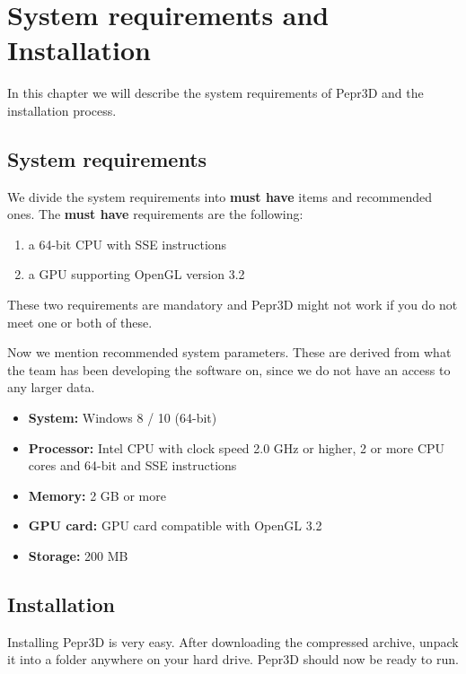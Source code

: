 \chapter{System requirements and Installation}

In this chapter we will describe the system requirements of Pepr3D and the installation process.

\section{System requirements}

We divide the system requirements into \textbf{must have} items and recommended ones. The \textbf{must have} requirements are the following:

\begin{enumerate}
\item a 64-bit CPU with SSE instructions
\item a GPU supporting OpenGL version 3.2
\end{enumerate}

These two requirements are mandatory and Pepr3D might not work if you do not meet one or both of these.

Now we mention recommended system parameters. These are derived from what the team has been developing the software on, since we do not have an access to any larger data.

\begin{itemize}
\item \textbf{System:} Windows 8 / 10 (64-bit)
\item \textbf{Processor:} Intel CPU with clock speed 2.0 GHz or higher, 2 or more CPU cores and 64-bit and SSE instructions
\item \textbf{Memory:} 2 GB or more
\item \textbf{GPU card:} GPU card compatible with OpenGL 3.2
\item \textbf{Storage:} 200 MB
\end{itemize}

\section{Installation}

Installing Pepr3D is very easy. After downloading the compressed archive, unpack it into a folder anywhere on your hard drive. Pepr3D should now be ready to run.